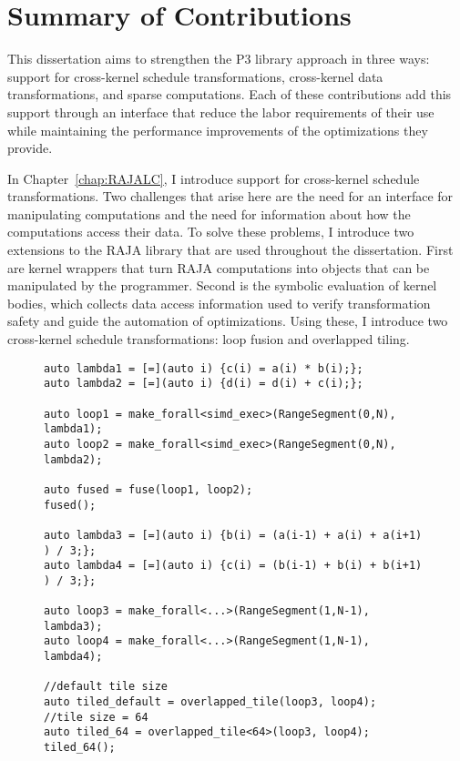 \section{Summary of Contributions}

This dissertation aims to strengthen the P3 library approach in three ways: support for cross-kernel schedule transformations, cross-kernel data transformations, and sparse computations.
Each of these contributions add this support through an interface that reduce the labor requirements of their use while maintaining the performance improvements of the optimizations they provide.

In Chapter~\ref{chap:RAJALC}, I introduce support for cross-kernel schedule transformations.
Two challenges that arise here are the need for an interface for manipulating computations and the need for information about how the computations access their data.
To solve these problems, I introduce two extensions to the RAJA library that are used throughout the dissertation.
First are kernel wrappers that turn RAJA computations into objects that can be manipulated by the programmer.
Second is the symbolic evaluation of kernel bodies, which collects data access information used to verify transformation safety and guide the automation of optimizations.
Using these, I introduce two cross-kernel schedule transformations: loop fusion and overlapped tiling.
\begin{figure}[t]
\begin{lstlisting}[caption={Using the \texttt{fuse} and \texttt{overlapped\_tile} transformations.}, label={Intro:transformExample}]
auto lambda1 = [=](auto i) {c(i) = a(i) * b(i);};
auto lambda2 = [=](auto i) {d(i) = d(i) + c(i);};

auto loop1 = make_forall<simd_exec>(RangeSegment(0,N), lambda1);
auto loop2 = make_forall<simd_exec>(RangeSegment(0,N), lambda2);

auto fused = fuse(loop1, loop2);
fused();

auto lambda3 = [=](auto i) {b(i) = (a(i-1) + a(i) + a(i+1) ) / 3;};
auto lambda4 = [=](auto i) {c(i) = (b(i-1) + b(i) + b(i+1) ) / 3;};

auto loop3 = make_forall<...>(RangeSegment(1,N-1), lambda3);
auto loop4 = make_forall<...>(RangeSegment(1,N-1), lambda4);

//default tile size
auto tiled_default = overlapped_tile(loop3, loop4);
//tile size = 64
auto tiled_64 = overlapped_tile<64>(loop3, loop4);
tiled_64();
\end{lstlisting}
\end{figure}


